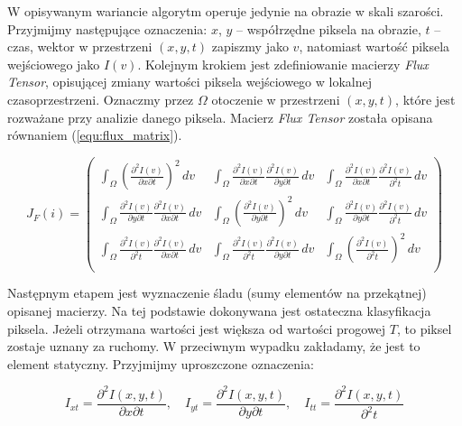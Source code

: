 W opisywanym wariancie algorytm operuje jedynie na obrazie w skali szarości. 
Przyjmijmy następujące oznaczenia: $x$, $y$ -- współrzędne piksela na obrazie, $t$ -- czas, wektor w przestrzeni $(x,y,t)$ zapiszmy jako $v$, natomiast wartość piksela wejściowego jako $I(v)$. 
Kolejnym krokiem jest zdefiniowanie macierzy \textit{Flux Tensor}, opisującej zmiany wartości piksela wejściowego w lokalnej czasoprzestrzeni. 
Oznaczmy przez $\Omega$ otoczenie w przestrzeni $(x,y,t)$, które jest rozważane przy analizie danego piksela. 
Macierz \textit{Flux Tensor} została opisana równaniem (\ref{equ:flux_matrix}).

\begin{equation}
			J_F(i) = 
			\begin{pmatrix}
			\int_\Omega \left(\frac{\partial^2 I(v)}{\partial x\partial t}\right)^2\,dv & 
			\int_\Omega \frac{\partial^2 I(v)}{\partial x\partial t}\frac{\partial^2 I(v)}{\partial y 							\partial t}\,dv & 
			\int_\Omega \frac{\partial^2 I(v)}{\partial x\partial t}\frac{\partial^2 I(v)}{\partial^2 t}						\,dv	\\
			
			\int_\Omega \frac{\partial^2 I(v)}{\partial y\partial t}\frac{\partial^2 I(v)}{\partial x 							\partial t}\,dv & 
			\int_\Omega \left(\frac{\partial^2 I(v)}{\partial y\partial t}\right)^2\,dv & 
			\int_\Omega \frac{\partial^2 I(v)}{\partial y\partial t}\frac{\partial^2 I(v)}{\partial^2 t}						\,dv \\
			
			\int_\Omega \frac{\partial^2 I(v)}{\partial^2 t}\frac{\partial^2 I(v)}{\partial x\partial t}						\,dv & 
			\int_\Omega \frac{\partial^2 I(v)}{\partial^2 t}\frac{\partial^2 I(v)}{\partial y\partial t}						\,dv & 
			\int_\Omega \left(\frac{\partial^2 I(v)}{\partial^2 t}\right)^2\,dv \\		
			\end{pmatrix}
\label{equ:flux_matrix}
\end{equation}

Następnym etapem jest wyznaczenie śladu (sumy elementów na przekątnej) opisanej macierzy. 
Na tej podstawie dokonywana jest ostateczna klasyfikacja piksela. 
Jeżeli otrzymana wartości jest większa od wartości progowej $T$, to piksel zostaje uznany za ruchomy. 
W przeciwnym wypadku zakładamy, że jest to element statyczny. 
Przyjmijmy uproszczone oznaczenia:

\begin{equation}
	I_{xt}=\frac{\partial^2I(x,y,t)}{\partial x\partial t},\quad I_{yt}=\frac{\partial^2I(x,y,t)}{\partial y			\partial t},\quad I_{tt}=\frac{\partial^2I(x,y,t)}{\partial^2 t}	
\label{equ:flux_components}
\end{equation}


